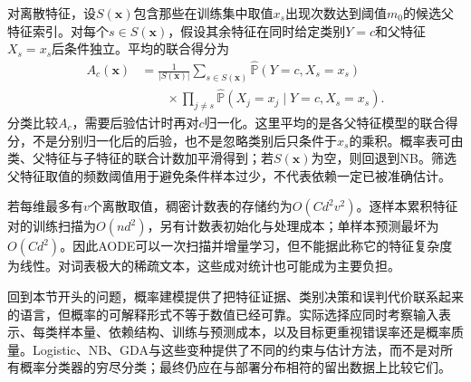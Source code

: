 对离散特征，设$S(\bm{x})$包含那些在训练集中取值$x_s$出现次数达到阈值$m_0$的候选父特征索引。对每个$s\in S(\bm{x})$，假设其余特征在同时给定类别$Y=c$和父特征$X_s=x_s$后条件独立。平均的联合得分为
\begin{equation}
  \label{eq:classification-aode}
  \begin{aligned}
    A_c(\bm{x})
      &=\frac{1}{|S(\bm{x})|}
        \sum_{s\in S(\bm{x})}
        \widehat{\mathbb{P}}(Y=c,X_s=x_s)\\
      &\qquad{}\times
        \prod_{j\neq s}
        \widehat{\mathbb{P}}(X_j=x_j\mid Y=c,X_s=x_s).
  \end{aligned}
\end{equation}
分类比较$A_c$，需要后验估计时再对$c$归一化。这里平均的是各父特征模型的联合得分，不是分别归一化后的后验，也不是忽略类别后只条件于$x_s$的乘积。概率表可由类、父特征与子特征的联合计数加平滑得到；若$S(\bm{x})$为空，则回退到NB。筛选父特征取值的频数阈值用于避免条件样本过少，不代表依赖一定已被准确估计。

若每维最多有$v$个离散取值，稠密计数表的存储约为$O(Cd^2v^2)$。逐样本累积特征对的训练扫描为$O(nd^2)$，另有计数表初始化与处理成本；单样本预测最坏为$O(Cd^2)$。因此AODE可以一次扫描并增量学习，但不能据此称它的特征复杂度为线性。对词表极大的稀疏文本，这些成对统计也可能成为主要负担。

回到本节开头的问题，概率建模提供了把特征证据、类别决策和误判代价联系起来的语言，但概率的可解释形式不等于数值已经可靠。实际选择应同时考察输入表示、每类样本量、依赖结构、训练与预测成本，以及目标更重视错误率还是概率质量。Logistic、NB、GDA与这些变种提供了不同的约束与估计方法，而不是对所有概率分类器的穷尽分类；最终仍应在与部署分布相符的留出数据上比较它们。

